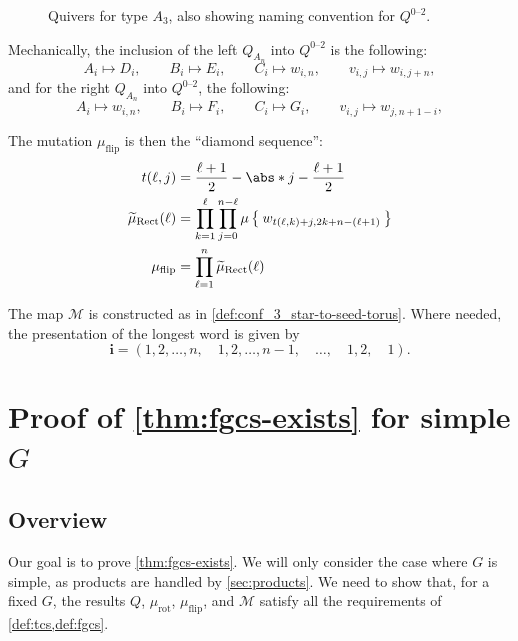 \documentclass{amsart}
\theoremstyle{plain}
\theoremstyle{definition}
\theoremstyle{remark}
\newcommand{\Qdv}{Q^{0\text{--}2}}
\newcommand{\conftoquiv}{\mathcal{M}}
\newcommand{\word}[1]{\mathbf{#1}}
\newcommand{\muflip}{{\mu_{\text{flip}}}}
\newcommand{\murot}{{\mu_{\text{rot}}}}
\newcommand{\muint}[1]{\widetilde{\mu}_{\text{#1}}}
\DeclarePairedDelimiter\abs||
\begin{document}
  \begin{figure}[h]
    \centering 

    \caption{Quivers for type $A_3$, also showing naming convention for
      $\Qdv$.
      \label{fig:amalgamation-QAn}
    }
  \end{figure}

  Mechanically, the inclusion of the left $Q_{A_n}$ into $\Qdv$ is the
  following: \[ A_i \mapsto D_i, \qquad B_i \mapsto E_i, \qquad C_i
    \mapsto w_{i,n}, \qquad v_{i,j} \mapsto w_{i,j+n}, \] and for the
  right $Q_{A_n}$ into $\Qdv$, the following: \[ A_i \mapsto w_{i,n},
    \qquad B_i \mapsto F_i, \qquad C_i \mapsto G_i, \qquad v_{i,j}
    \mapsto w_{j,n+1-i}, \]

  The mutation $\muflip$ is then the ``diamond sequence'':
  \begin{align*}
    t(\ell, j) &= \frac{\ell + 1}{2} - \abs*{j - \frac{\ell + 1}{2}} \\
    \muint{Rect}(\ell) &= \prod_{k = 1}^{\ell} \prod_{j=0}^{n-\ell} \mu\Set{w_{t(\ell,k) + j,2k + n - (\ell + 1)}} \\
    \muflip &= \prod_{\ell = 1}^{n} \muint{Rect}(\ell)
  \end{align*}

  The map $\conftoquiv$ is constructed as in
  \cref{def:conf_3_star-to-seed-torus}. Where needed, the presentation
  of the longest word is given by \[ \word{i} = (1, 2, \dotsc, n, \quad
    1, 2, \dotsc, n-1, \quad \dotsc, \quad 1, 2, \quad 1). \]

  \section{Proof of \cref{thm:fgcs-exists} for simple
    \texorpdfstring{$G$}{G}}

  \label{sec:proof}

  \subsection{Overview}

  Our goal is to prove \cref{thm:fgcs-exists}. We will only consider the
  case where $G$ is simple, as products are handled by
  \cref{sec:products}. We need to show that, for a fixed $G$, the
  results $Q$, $\murot$, $\muflip$, and $\conftoquiv$ satisfy all the
  requirements of \cref{def:tcs,def:fgcs}.
\end{document}

